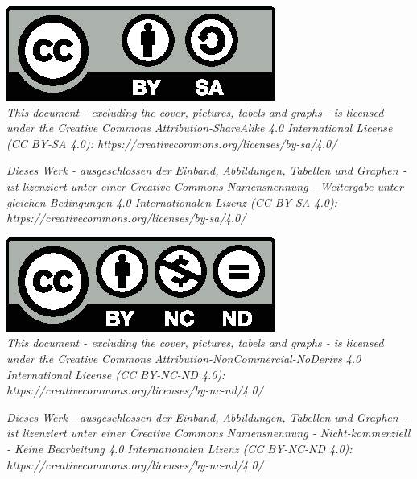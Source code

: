 \ifdissForPrint
\iflicense
\newpage
\thispagestyle{empty}

\vspace*{\fill} 

\noindent
\begin{minipage}[b]{\textwidth}

\ifsharealike

\includegraphics[scale=1]{License/by-sa.eps}\\
 
\ifenglish
\textit{This document - excluding the cover, pictures, tabels and graphs - is licensed under the Creative Commons Attribution-ShareAlike 4.0 International License (CC BY-SA 4.0): https://creativecommons.org/licenses/by-sa/4.0/}

\else
\textit{Dieses Werk - ausgeschlossen der Einband, Abbildungen, Tabellen und Graphen - ist lizenziert unter einer Creative Commons Namensnennung - Weitergabe unter gleichen Bedingungen 4.0 Internationalen Lizenz (CC BY-SA 4.0): https://creativecommons.org/licenses/by-sa/4.0/}
\fi

\else

\includegraphics[scale=1]{License/by-nc-nd.eps}\\

\ifenglish
\textit{This document - excluding the cover, pictures, tabels and graphs - is licensed under the Creative Commons Attribution-NonCommercial-NoDerivs 4.0 International License (CC BY-NC-ND 4.0): https://creativecommons.org/licenses/by-nc-nd/4.0/}

\else
\textit{Dieses Werk - ausgeschlossen der Einband, Abbildungen, Tabellen und Graphen - ist lizenziert unter einer Creative Commons Namensnennung - Nicht-kommerziell - Keine Bearbeitung 4.0 Internationalen Lizenz (CC BY-NC-ND 4.0): https://creativecommons.org/licenses/by-nc-nd/4.0/}
\fi
\fi

\end{minipage}
\fi

